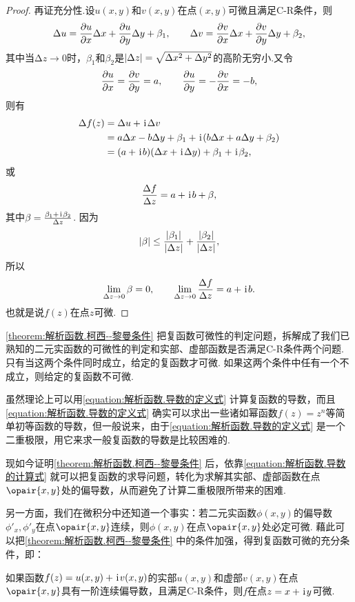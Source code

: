\begin{theorem}
\begin{proof}
再证充分性.设\(u(x,y)\)和\(v(x,y)\)在点\((x,y)\)可微且满足C-R条件，则\[
\Delta u = \pdv{u}{x} \Delta x + \pdv{u}{y} \Delta y + \beta_1,
\qquad
\Delta v = \pdv{v}{x} \Delta x + \pdv{v}{y} \Delta y + \beta_2,
\]其中当\(\increment z\to0\)时，\(\beta_1\)和\(\beta_2\)是\(\abs{\Delta z} = \sqrt{\Delta x^2 + \Delta y^2}\)的高阶无穷小.又令\[
\pdv{u}{x} = \pdv{v}{y} = a,
\qquad
\pdv{u}{y} = -\pdv{v}{x} = -b,
\]则有\begin{align*}
\Delta f(z) &= \Delta u + \kern1pt\mathrm{i}\kern1pt \Delta v \\
&= a \Delta x - b \Delta y + \beta_1 + \kern1pt\mathrm{i}\kern1pt (b \Delta x + a \Delta y + \beta_2) \\
&= (a+\kern1pt\mathrm{i}\kern1pt b)(\Delta x + \kern1pt\mathrm{i}\kern1pt \Delta y) + \beta_1 + \kern1pt\mathrm{i}\kern1pt \beta_2,
\end{align*}或\[
\frac{\Delta f}{\Delta z} = a + \kern1pt\mathrm{i}\kern1pt b + \beta,
\]其中\(\beta = \frac{\beta_1 + \kern1pt\mathrm{i}\kern1pt \beta_2}{\Delta z}\).
因为\[
\abs{\beta} \leq
\frac{\abs{\beta_1}}{\abs{\Delta z}} + \frac{\abs{\beta_2}}{\abs{\Delta z}},
\]所以\[
\lim\limits_{\Delta z\to0} \beta = 0,
\qquad
\lim\limits_{\Delta z\to0} \frac{\Delta f}{\Delta z} = a+\kern1pt\mathrm{i}\kern1pt b.
\]
也就是说\(f(z)\)在点\(z\)可微.
\end{proof}
\end{theorem}

\cref{theorem:解析函数.柯西--黎曼条件} 把复函数可微性的判定问题，拆解成了我们已熟知的二元实函数的可微性的判定和实部、虚部函数是否满足C-R条件两个问题.
只有当这两个条件同时成立，给定的复函数才可微.
如果这两个条件中任有一个不成立，则给定的复函数不可微.

虽然理论上可以用\cref{equation:解析函数.导数的定义式} 计算复函数的导数，而且\cref{equation:解析函数.导数的定义式} 确实可以求出一些诸如幂函数\(f(z) = z^n\)等简单初等函数的导数，但一般说来，由于\cref{equation:解析函数.导数的定义式} 是一个二重极限，用它来求一般复函数的导数是比较困难的.

现如今证明\cref{theorem:解析函数.柯西--黎曼条件} 后，依靠\cref{equation:解析函数.导数的计算式} 就可以把复函数的求导问题，转化为求解其实部、虚部函数在点\(\opair{x,y}\)处的偏导数，从而避免了计算二重极限所带来的困难.

另一方面，我们在微积分中还知道一个事实：若二元实函数\(\phi(x,y)\)的偏导数\(\phi'_x,\phi'_y\)在点\(\opair{x,y}\)连续，则\(\phi(x,y)\)在点\(\opair{x,y}\)处必定可微.
藉此可以把\cref{theorem:解析函数.柯西--黎曼条件} 中的条件加强，得到复函数可微的充分条件，即：
\begin{theorem}\label{theorem:解析函数.复函数可微的充分条件}
如果函数\(f(z)=u(x,y)+\kern1pt\mathrm{i}\kern1pt v(x,y)\)的实部\(u(x,y)\)和虚部\(v(x,y)\)在点\(\opair{x,y}\)具有一阶连续偏导数，且满足C-R条件，则\(f\)在点\(z=x+\kern1pt\mathrm{i}\kern1pt y\)可微.
\end{theorem}

